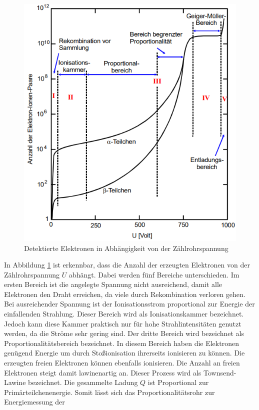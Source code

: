\begin{figure}
    \centering
    \includegraphics[scale=0.6]{pics/Elektronen.png}
    \caption{Detektierte Elektronen in Abhängigkeit von der Zählrohrspannung}
    \label{fig:Elektronen}
  \end{figure}
In Abbildung \ref{fig:Elektronen} ist erkennbar, dass die Anzahl der erzeugten Elektronen von der Zählrohrspannung $U$ abhängt.
Dabei werden fünf Bereiche unterschieden. Im ersten Bereich ist die angelegte Spannung nicht ausreichend, damit alle Elektronen den Draht erreichen, da viele 
durch Rekombination verloren gehen.
Bei ausreichender Spannung ist der Ionisationsstrom proportional zur Energie der einfallenden Strahlung.
Dieser Bereich wird als Ionisationskammer bezeichnet.
Jedoch kann diese Kammer praktisch nur für hohe Strahlintensitäten genutzt werden, da die Ströme sehr gering sind.
Der dritte Bereich wird bezeichnet als Proportionalitätsbereich bezeichnet. In diesem Bereich haben die 
Elektronen genügend Energie um durch Stoßionisation ihrerseits ionisieren zu können.
Die erzeugten freien Elektronen können ebenfalls ionisieren. Die Anzahl an freien Elektronen steigt damit lawinenartig an. Dieser Prozess wird als
Townsend-Lawine bezeichnet. Die gesammelte Ladung $Q$ ist Proportional zur Primärteilchenenergie. Somit lässt sich das Proportionalitätsrohr zur Energiemessung der
